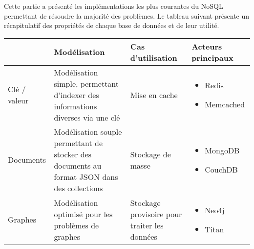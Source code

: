Cette partie a présenté les implémentations les plus courantes du NoSQL permettant de résoudre la majorité des problèmes. Le tableau suivant présente un récapitulatif des propriétés de chaque base de données et de leur utilité.\\

\begin{tabular}{|p{}|p{}|p{}|p{}|}
	\hline
	& Modélisation & Cas d'utilisation & Acteurs principaux \\\hline
	Clé / valeur 
	& Modélisation simple, permettant d'indexer des informations diverses via une clé 
	& Mise en cache 
	& \begin{itemize}
		\item Redis
		\item Memcached
	\end{itemize} \\\hline
	Documents
	& Modélisation souple permettant de stocker des documents au format JSON dans des collections 
	& Stockage de masse 
	& \begin{itemize}
		\item MongoDB
		\item CouchDB
	\end{itemize} \\\hline
	Graphes 
	& Modélisation optimisé pour les problèmes de graphes 
	& Stockage provisoire pour traiter les données 
	& \begin{itemize}
		\item Neo4j
		\item Titan
	\end{itemize} \\\hline
\end{tabular}